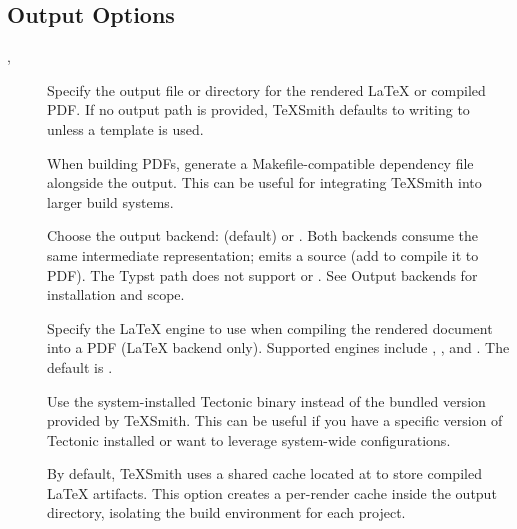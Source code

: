 \documentclass[a4paper,twoside]{article}
\begin{document}
\subsection{Output Options}
\begin{description}
\item[{, }] Specify the output file or directory for the rendered \LaTeX{} or compiled PDF. If no output path is provided, TeXSmith defaults to writing to  unless a template is used.
\item[{}] When building PDFs, generate a Makefile-compatible  dependency file alongside the output. This can be useful for integrating TeXSmith into larger build systems.
\item[{}] Choose the output backend:  (default) or . Both backends consume the same intermediate representation;  emits a  source (add  to compile it to PDF). The Typst path does not support  or . See Output backends for installation and scope.
\item[{}] Specify the \LaTeX{} engine to use when compiling the rendered document into a PDF (\LaTeX{} backend only). Supported engines include , , and . The default is .
\item[{}] Use the system-installed Tectonic binary instead of the bundled version provided by TeXSmith. This can be useful if you have a specific version of Tectonic installed or want to leverage system-wide configurations.
\item[{}] By default, TeXSmith uses a shared cache located at  to store compiled \LaTeX{} artifacts. This option creates a per-render cache inside the output directory, isolating the build environment for each project.
\end{description}
\end{document}
